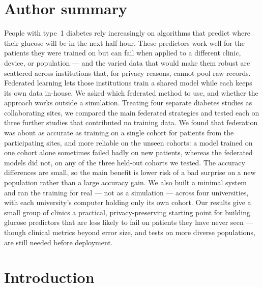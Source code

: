 \documentclass[10pt,letterpaper]{article}
\begin{document}
\section*{Author summary}
People with type~1 diabetes rely increasingly on algorithms that predict where
their glucose will be in the next half hour. These predictors work well for the
patients they were trained on but can fail when applied to a different clinic,
device, or population --- and the varied data that would make them robust are
scattered across institutions that, for privacy reasons, cannot pool raw
records. Federated learning lets those institutions train a shared model while
each keeps its own data in-house. We asked which federated method to use, and
whether the approach works outside a simulation. Treating four separate
diabetes studies as collaborating sites, we compared the main federated
strategies and tested each on three further studies that contributed no training
data.
We found that federation was about as accurate as training on a single cohort
for patients from the participating sites, and more reliable on the unseen
cohorts: a model trained on one cohort alone sometimes failed badly on new
patients, whereas the federated models did not, on any of the three held-out
cohorts we tested. The accuracy differences are
small, so the main benefit is lower risk of a bad surprise on a new population
rather than a large accuracy gain. We also built a minimal system and ran the
training for real --- not as a simulation --- across four universities, with each
university's computer holding only its own cohort. Our results
give a small group of clinics a practical, privacy-preserving starting point for
building glucose predictors that are less likely to fail on patients they have
never seen --- though clinical metrics beyond error size, and tests on more
diverse populations, are still needed before deployment.

\clearpage
{}
\linenumbers

\section*{Introduction}
\end{document}

